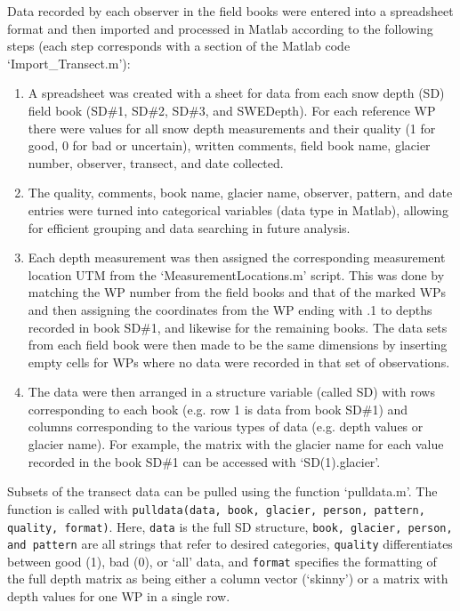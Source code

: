 \documentclass{sfuthesis}
\begin{document}
\begin{appendices}
Data recorded by each observer in the field books were entered into a spreadsheet format and then imported and processed in Matlab according to the following steps (each step corresponds with a section of the Matlab code `Import\_Transect.m'):
\begin{enumerate}
	\item A spreadsheet was created with a sheet for data from each snow depth (SD) field book (SD\#1, SD\#2, SD\#3, and SWEDepth). For each reference WP there were values for all snow depth measurements and their quality (1 for good, 0 for bad or uncertain), written comments, field book name, glacier number, observer, transect, and date collected.  
	\item The quality, comments, book name, glacier name, observer, pattern, and date entries were turned into categorical variables (data type in Matlab), allowing for efficient grouping and data searching in future analysis.
	\item Each depth measurement was then assigned the corresponding measurement location UTM from the `MeasurementLocations.m' script. This was done by matching the WP number from the field books and that of the marked WPs and then assigning the coordinates from the WP ending with .1 to depths recorded in book SD\#1, and likewise for the remaining books. The data sets from each field book were then made to be the same dimensions by inserting empty cells for WPs where no data were recorded in that set of observations. 
	\item The data were then arranged in a structure variable (called SD) with rows corresponding to each book (e.g. row 1 is data from book SD\#1) and columns corresponding to the various types of data (e.g. depth values or glacier name). For example, the matrix with the glacier name for each value recorded in the book SD\#1 can be accessed with `SD(1).glacier'.
\end{enumerate}

Subsets of the transect data can be pulled using the function `pulldata.m'. The function is called with \texttt{pulldata(data, book, glacier, person, pattern, quality, format)}. Here, \texttt{data} is the full SD structure, \texttt{book, glacier, person, and pattern} are all strings that refer to desired categories, \texttt{quality} differentiates between good (1), bad (0), or `all' data, and \texttt{format} specifies the formatting of the full depth matrix as being either a column vector (`skinny') or a matrix with depth values for one WP in a single row. 


\end{appendices}
\end{document}
